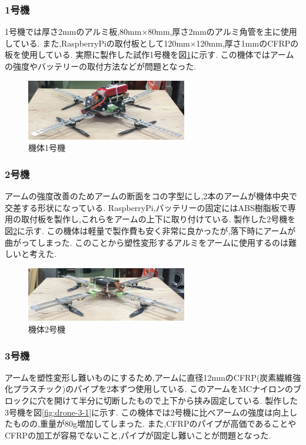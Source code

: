 \documentclass[12pt,oneside]{sotsuken_paper}
\begin{document}
\subsubsection{1号機}
1号機では厚さ2mmのアルミ板,80mm×80mm,厚さ2mmのアルミ角管を主に使用している.
また,RaspberryPiの取付板として120mm×120mm,厚さ1mmのCFRPの板を使用している.
実際に製作した試作1号機を図\ref{fig:drone-1}に示す.
この機体ではアームの強度やバッテリーの取付方法などが問題となった.

\begin{figure}[htbp]
	\begin{center}
		\includegraphics[width=70mm]{image/drone/drone-1.jpg}
		\caption{機体1号機}
		\label{fig:drone-1}
	\end{center}
\end{figure}

\subsubsection{2号機}
アームの強度改善のためアームの断面をコの字型にし,2本のアームが機体中央で交差する形状になっている.
RaspberryPi,バッテリーの固定にはABS樹脂板で専用の取付板を製作し,これらをアームの上下に取り付けている.
製作した2号機を図\ref{fig:drone-2}に示す.
この機体は軽量で製作費も安く非常に良かったが,落下時にアームが曲がってしまった.
このことから塑性変形するアルミをアームに使用するのは難しいと考えた.

\begin{figure}[htbp]
	\begin{center}
		\includegraphics[width=70mm]{image/drone/drone-2.jpg}
		\caption{機体2号機}
		\label{fig:drone-2}
	\end{center}
\end{figure}

\subsubsection{3号機}
アームを塑性変形し難いものにするため,アームに直径12mmのCFRP(炭素繊維強化プラスチック)のパイプを2本ずつ使用している.
このアームをMCナイロンのブロックに穴を開けて半分に切断したもので上下から挟み固定している.
製作した3号機を図\ref{fig:drone-3-1}に示す.
この機体では2号機に比べアームの強度は向上したものの,重量が80g増加してしまった.
また,CFRPのパイプが高価であることやCFRPの加工が容易でないこと,パイプが固定し難いことが問題となった.
\end{document}
